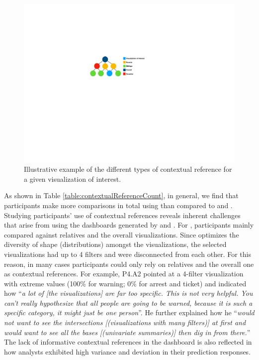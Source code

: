 \begin{figure}[h!]
\centering
\includegraphics[width=\linewidth]{figures/contextual_reference.pdf}
\caption{Illustrative example of the different types of contextual reference for a given visualization of interest.}
\label{fig:reference}
\end{figure}
As shown in Table \ref{table:contextualReferenceCount}, in general, we find that participants make more comparisons in total using \system than compared to \cluster and \BFS. Studying participants' use of contextual references reveals inherent challenges that arise from using the dashboards generated by \BFS and \cluster. For \cluster , participants mainly compared against relatives and the overall visualizations. Since \cluster optimizes the diversity of shape (distributions) amongst the visualizations, the selected visualizations had up to 4 filters and were disconnected from each other. For this reason, in many cases participants could only rely on relatives and the overall one as contextual references. For example, P4.A2 pointed at a 4-filter visualization with extreme values (100\% for warning; 0\% for arrest and ticket) and indicated how ``\textit{a lot of [the visualizations] are far too specific. This is not very helpful. You can't really hypothesize that all people are going to be warned, because it is such a specific category, it might just be one person}''. %
He further explained how he ``\textit{would not want to see the intersections [(visualizations with many filters)] at first and would want to see all the bases [(univariate summaries)] then dig in from there.}'' The lack of informative contextual references in the \cluster dashboard is also reflected in how analysts exhibited high variance and deviation in their prediction responses.
